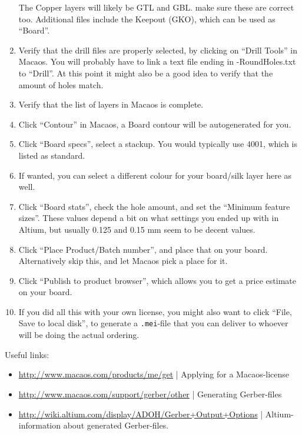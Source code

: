\begin{enumerate}
  The Copper layers will likely be GTL and GBL. make sure these are correct
  too. Additional files include the Keepout (GKO), which can be used as
  ``Board''.
\item Verify that the drill files are properly selected, by clicking on ``Drill
  Tools'' in Macaos. You will probably have to link a text file ending in
  -RoundHoles.txt to ``Drill''. At this point it might also be a good idea to
  verify that the amount of holes match.
\item Verify that the list of layers in Macaos is complete.
\item Click ``Contour'' in Macaos, a Board contour will be autogenerated for
  you.
\item Click ``Board specs'', select a stackup. You would typically use 4001,
  which is listed as standard.
\item If wanted, you can select a different colour for your board/silk layer
  here as well.
\item Click ``Board stats'', check the hole amount, and set the ``Minimum
  feature sizes''. These values depend a bit on what settings you ended up with
  in Altium, but usually 0.125 and 0.15 mm seem to be decent values.
\item Click ``Place Product/Batch number'', and place that on your board.
  Alternatively skip this, and let Macaos pick a place for it.
\item Click ``Publish to product browser'', which allows you to get a price
  estimate on your board.
\item If you did all this with your own license, you might also want to click
  ``File, Save to local disk'', to generate a {\tt .mei}-file that you can
  deliver to whoever will be doing the actual ordering.
\end{enumerate}

Useful links:
\begin{itemize}
\item \url{http://www.macaos.com/products/me/get} | Applying for a
  Macaos-license
\item \url{http://www.macaos.com/support/gerber/other} | Generating Gerber-files
\item \url{http://wiki.altium.com/display/ADOH/Gerber+Output+Options} |
  Altium-information about generated Gerber-files.
\end{itemize}
